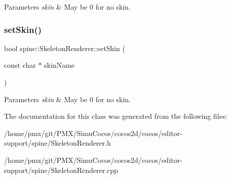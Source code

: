 \begin{DoxyParams}{Parameters}
{\em skin} & May be 0 for no skin. \\
\hline
\end{DoxyParams}
\mbox{\label{classspine_1_1SkeletonRenderer_ab56abe60544227f4e4ce72c1ffd463c7}} 
\subsubsection{\texorpdfstring{set\+Skin()}{setSkin()}\hspace{0.1cm}{\footnotesize\ttfamily [2/2]}}
{\footnotesize\ttfamily bool spine\+::\+Skeleton\+Renderer\+::set\+Skin (\begin{DoxyParamCaption}\item[{const char $\ast$}]{skin\+Name }\end{DoxyParamCaption})}


\begin{DoxyParams}{Parameters}
{\em skin} & May be 0 for no skin. \\
\hline
\end{DoxyParams}


The documentation for this class was generated from the following files\+:\begin{DoxyCompactItemize}
\item 
/home/pmx/git/\+P\+M\+X/\+Simu\+Cocos/cocos2d/cocos/editor-\/support/spine/Skeleton\+Renderer.\+h\item 
/home/pmx/git/\+P\+M\+X/\+Simu\+Cocos/cocos2d/cocos/editor-\/support/spine/Skeleton\+Renderer.\+cpp\end{DoxyCompactItemize}
